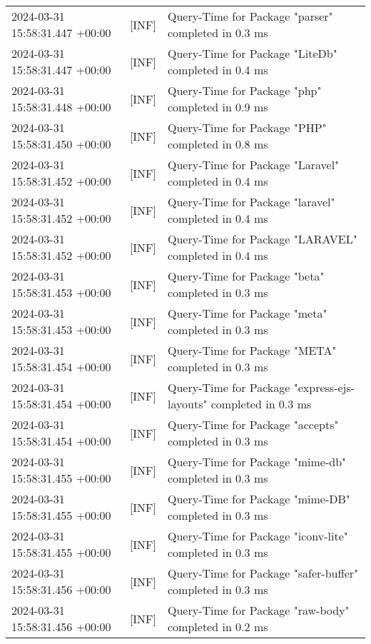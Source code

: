 {{\begin{tabularx}{\textwidth}{|l|l|X|}
                    2024-03-31 15:58:31.447 +00:00 & [INF] & Query-Time for Package "parser" completed in 0.3 ms \\
                    2024-03-31 15:58:31.447 +00:00 & [INF] & Query-Time for Package "LiteDb" completed in 0.4 ms \\
                    2024-03-31 15:58:31.448 +00:00 & [INF] & Query-Time for Package "php" completed in 0.9 ms \\
                    2024-03-31 15:58:31.450 +00:00 & [INF] & Query-Time for Package "PHP" completed in 0.8 ms \\
                    2024-03-31 15:58:31.452 +00:00 & [INF] & Query-Time for Package "Laravel" completed in 0.4 ms \\
                    2024-03-31 15:58:31.452 +00:00 & [INF] & Query-Time for Package "laravel" completed in 0.4 ms \\
                    2024-03-31 15:58:31.452 +00:00 & [INF] & Query-Time for Package "LARAVEL" completed in 0.4 ms \\
                    2024-03-31 15:58:31.453 +00:00 & [INF] & Query-Time for Package "beta" completed in 0.3 ms \\
                    2024-03-31 15:58:31.453 +00:00 & [INF] & Query-Time for Package "meta" completed in 0.3 ms \\
                    2024-03-31 15:58:31.454 +00:00 & [INF] & Query-Time for Package "META" completed in 0.3 ms \\
                    2024-03-31 15:58:31.454 +00:00 & [INF] & Query-Time for Package "express-ejs-layouts" completed in 0.3 ms \\
                    2024-03-31 15:58:31.454 +00:00 & [INF] & Query-Time for Package "accepts" completed in 0.3 ms \\
                    2024-03-31 15:58:31.455 +00:00 & [INF] & Query-Time for Package "mime-db" completed in 0.3 ms \\
                    2024-03-31 15:58:31.455 +00:00 & [INF] & Query-Time for Package "mime-DB" completed in 0.3 ms \\
                    2024-03-31 15:58:31.455 +00:00 & [INF] & Query-Time for Package "iconv-lite" completed in 0.3 ms \\
                    2024-03-31 15:58:31.456 +00:00 & [INF] & Query-Time for Package "safer-buffer" completed in 0.3 ms \\
                    2024-03-31 15:58:31.456 +00:00 & [INF] & Query-Time for Package "raw-body" completed in 0.2 ms \\

\end{tabularx}}}
